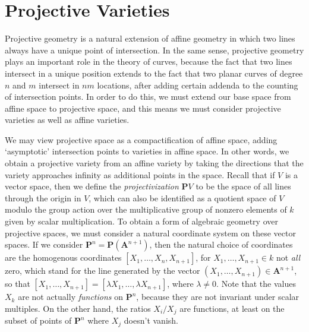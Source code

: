 \chapter{Projective Varieties}

Projective geometry is a natural extension of affine geometry in which two lines always have a unique point of intersection. In the same sense, projective geometry plays an important role in the theory of curves, because the fact that two lines intersect in a unique position extends to the fact that two planar curves of degree $n$ and $m$ intersect in $nm$ locations, after adding certain addenda to the counting of intersection points. In order to do this, we must extend our base space from affine space to projective space, and this means we must consider projective varieties as well as affine varieties.

We may view projective space as a compactification of affine space, adding `asymptotic' intersection points to varieties in affine space. In other words, we obtain a projective variety from an affine variety by taking the directions that the variety approaches infinity as additional points in the space. Recall that if $V$ is a vector space, then we define the {\it projectivization} $\mathbf{P} V$ to be the space of all lines through the origin in $V$, which can also be identified as a quotient space of $V$ modulo the group action over the multiplicative group of nonzero elements of $k$ given by scalar multiplication. To obtain a form of algebraic geometry over projective spaces, we must consider a natural coordinate system on these vector spaces. If we consider $\mathbf{P}^n = \mathbf{P}(\mathbf{A}^{n+1})$, then the natural choice of coordinates are the homogenous coordinates $[X_1, \dots, X_n, X_{n+1}]$, for $X_1, \dots, X_{n+1} \in k$ not {\it all} zero, which stand for the line generated by the vector $(X_1, \dots, X_{n+1}) \in \mathbf{A}^{n+1}$, so that $[X_1, \dots, X_{n+1}] = [\lambda X_1, \dots, \lambda X_{n+1}]$, where $\lambda \neq 0$. Note that the values $X_k$ are not actually {\it functions} on $\mathbf{P}^n$, because they are not invariant under scalar multiples. On the other hand, the ratios $X_i/X_j$ are functions, at least on the subset of points of $\mathbf{P}^n$ where $X_j$ doesn't vanish.

